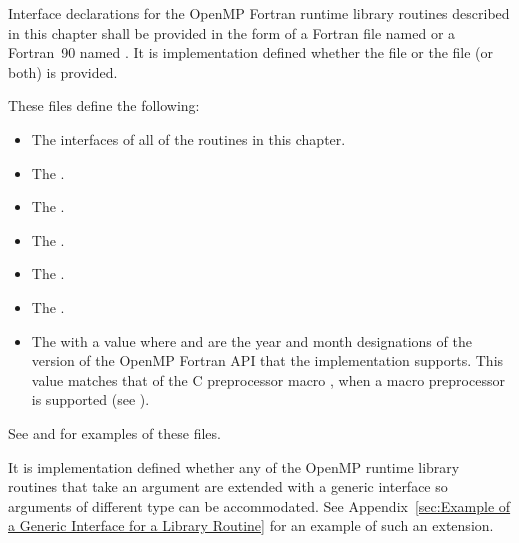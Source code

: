 Interface declarations for the OpenMP Fortran runtime library routines described in this 
chapter shall be provided in the form of a Fortran  file named  or 
a Fortran~90  named . It is implementation defined whether the 
 file or the  file (or both) is provided.

These files define the following:

\begin{itemize}
\item The interfaces of all of the routines in this chapter.

\item The   .

\item The   .

\item The   .

\item The   .

\item The   .

\item The    with a value  where  
and  are the year and month designations of the version of the OpenMP Fortran 
API that the implementation supports. This value matches that of the C preprocessor 
macro , when a macro preprocessor is supported (see 
).
\end{itemize}

See  
and  
for examples of these files.

It is implementation defined whether any of the OpenMP runtime library routines that 
take an argument are extended with a generic interface so arguments of different  
type can be accommodated. See Appendix~\ref{sec:Example of a Generic Interface for a Library Routine}
for an example of such an extension. 
\fortranspecificend









